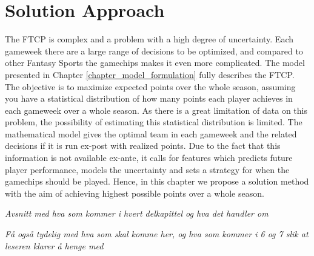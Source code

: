 

\chapter{Solution Approach} \label{chapter_solution_approach}

The FTCP is complex and a problem with a high degree of uncertainty. Each gameweek there are a large range of decisions to be optimized, and compared to other Fantasy Sports the gamechips makes it even more complicated. The model presented in Chapter \ref{chapter_model_formulation} fully describes the FTCP.
The objective is to maximize expected points over the whole season, assuming you have a statistical distribution of how many points each player achieves in each gameweek over a whole season. As there is a great limitation of data on this problem, the possibility of estimating this statistical distribution is limited. The mathematical model gives the optimal team in each gameweek and the related decisions if it is run ex-post with realized points. Due to the fact that this information is not available ex-ante, it calls for features which predicts future player performance, models the uncertainty and sets a strategy for when the gamechips should be played. Hence, in this chapter we propose a solution method with the aim of achieving highest possible points over a whole season.

\newpar

\textit{Avsnitt med hva som kommer i hvert delkapittel og hva det handler om}

\textit{Få også tydelig med hva som skal komme her, og hva som kommer i 6 og 7 slik at leseren klarer å henge med}

